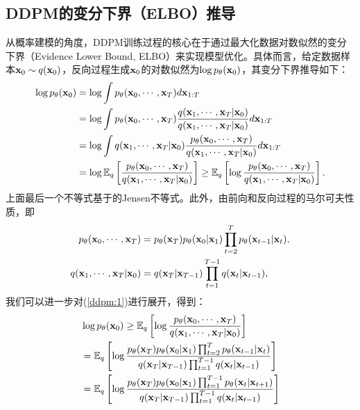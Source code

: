\documentclass[11pt,a4paper,UTF8]{ctexart}
\begin{document}
\begin{appendices}

\section{DDPM的变分下界（ELBO）推导}
\label{app:ddpm_elbo}

从概率建模的角度，DDPM训练过程的核心在于通过最大化数据对数似然的变分下界（Evidence Lower Bound, ELBO）来实现模型优化。具体而言，给定数据样本$\mathbf{x}_0\sim q(\mathbf{x}_0)$，反向过程生成$\mathbf{x}_0$的对数似然为$\log p_{\theta}(\mathbf{x}_0)$，其变分下界推导如下：
\begin{align}
\begin{split}
    \log p_{\theta}(\mathbf{x}_0) &= \log \int p_{\theta}(\mathbf{x}_0,\cdots,\mathbf{x}_T)d\mathbf{x}_{1:T} \\
    &= \log \int p_{\theta}(\mathbf{x}_0,\cdots,\mathbf{x}_T)\frac{q(\mathbf{x}_1,\cdots,\mathbf{x}_T|\mathbf{x}_0)}{q(\mathbf{x}_1,\cdots,\mathbf{x}_T|\mathbf{x}_0)}d\mathbf{x}_{1:T} \\
    &= \log \int q(\mathbf{x}_1,\cdots,\mathbf{x}_T|\mathbf{x}_0)\frac{p_{\theta}(\mathbf{x}_0,\cdots,\mathbf{x}_T)}{q(\mathbf{x}_1,\cdots,\mathbf{x}_T|\mathbf{x}_0)}d\mathbf{x}_{1:T} \\
    &= \log \mathbb{E}_q \left[\frac{p_{\theta}(\mathbf{x}_0,\cdots,\mathbf{x}_T)}{q(\mathbf{x}_1,\cdots,\mathbf{x}_T|\mathbf{x}_0)}\right]  \geq \mathbb{E}_q \left[\log \frac{p_{\theta}(\mathbf{x}_0,\cdots,\mathbf{x}_T)}{q(\mathbf{x}_1,\cdots,\mathbf{x}_T|\mathbf{x}_0)}\right].
\end{split}
\label{ddpm:1}
\end{align}
上面最后一个不等式基于的Jensen不等式。此外，由前向和反向过程的马尔可夫性质，即
\begin{align*}
    p_{\theta}(\mathbf{x}_0,\cdots,\mathbf{x}_T) &= p_{\theta}(\mathbf{x}_T)p_{\theta}(\mathbf{x}_0|\mathbf{x}_1)\prod_{t=2}^T p_{\theta}(\mathbf{x}_{t-1}|\mathbf{x}_t),\\
    q(\mathbf{x}_1,\cdots,\mathbf{x}_T|\mathbf{x}_0) &= q(\mathbf{x}_T|\mathbf{x}_{T-1})\prod_{t=1}^{T-1}q(\mathbf{x}_t|\mathbf{x}_{t-1}),
\end{align*}
我们可以进一步对(\ref{ddpm:1})进行展开，得到：
\begin{align}
\begin{split}
    &\log p_{\theta}(\x_0) \geq \E_q \left[\log \frac{p_{\theta}(\x_0,\cdots,\x_T)}{q(\x_1,\cdots,\x_T|\x_0)}\right] \\
    &= \E_q \left[\log\frac{p_{\theta}(\x_T)p_{\theta}(\x_0|\x_1)\prod_{t=2}^T p_{\theta}(\x_{t-1}|\x_t)}{q(\x_T|\x_{T-1})\prod_{t=1}^{T-1}q(\x_t|\x_{t-1})} \right] \\
    &= \E_q \left[\log\frac{p_{\theta}(\x_T)p_{\theta}(\x_0|\x_1)\prod_{t=1}^{T-1} p_{\theta}(\x_{t}|\x_{t+1})}{q(\x_T|\x_{T-1})\prod_{t=1}^{T-1}q(\x_t|\x_{t-1})} \right] \\

\end{split}
\end{align}
\end{appendices}
\end{document}
